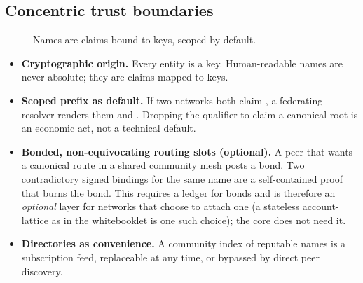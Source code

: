 \documentclass[a4paper,11pt,twoside,parskip=half-,headings=small]{scrartcl}
\begin{document}
\subsection{Concentric trust boundaries}
\begin{figure}[H]
\centering
{}
\caption{Names are claims bound to keys, scoped by default.}
\end{figure}

\begin{itemize}
  \item \textbf{Cryptographic origin.} Every entity is a key. Human-readable names are never
        absolute; they are claims mapped to keys.
  \item \textbf{Scoped prefix as default.} If two networks both claim , a federating
        resolver renders them  and .
        Dropping the qualifier to claim a canonical root is an economic act, not a technical default.
  \item \textbf{Bonded, non-equivocating routing slots (optional).} A peer that wants a canonical
        route in a shared community mesh posts a bond. Two contradictory signed bindings for the same
        name are a self-contained proof that burns the bond. This requires a ledger for bonds
        and is therefore an \emph{optional} layer for networks that choose to attach one (a stateless account-lattice as in the whitebooklet is one such choice); the core does not need it.
  \item \textbf{Directories as convenience.} A community index of reputable names is a subscription
        feed, replaceable at any time, or bypassed by direct peer discovery.
\end{itemize}
\end{document}
